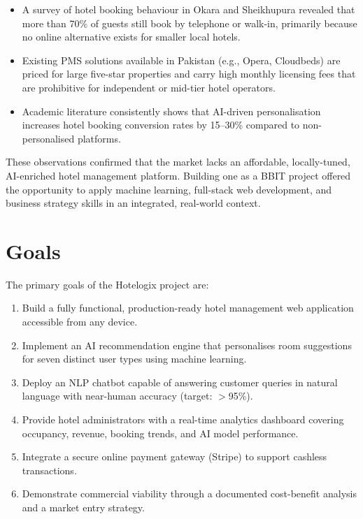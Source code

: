 \documentclass[12pt,a4paper]{report}
\begin{document}
\begin{itemize}[leftmargin=*, label=\textbullet]
  \item A survey of hotel booking behaviour in Okara and Sheikhupura revealed that more than 70\% of guests still book by telephone or walk-in, primarily because no online alternative exists for smaller local hotels.
  \item Existing PMS solutions available in Pakistan (e.g., Opera, Cloudbeds) are priced for large five-star properties and carry high monthly licensing fees that are prohibitive for independent or mid-tier hotel operators.
  \item Academic literature consistently shows that AI-driven personalisation increases hotel booking conversion rates by 15--30\% compared to non-personalised platforms.
\end{itemize}

These observations confirmed that the market lacks an affordable, locally-tuned, AI-enriched hotel management platform. Building one as a BBIT project offered the opportunity to apply machine learning, full-stack web development, and business strategy skills in an integrated, real-world context.

\section{Goals}

The primary goals of the Hotelogix project are:

\begin{enumerate}[leftmargin=*, label=\arabic*.]
  \item Build a fully functional, production-ready hotel management web application accessible from any device.
  \item Implement an AI recommendation engine that personalises room suggestions for seven distinct user types using machine learning.
  \item Deploy an NLP chatbot capable of answering customer queries in natural language with near-human accuracy (target: $>$95\%).
  \item Provide hotel administrators with a real-time analytics dashboard covering occupancy, revenue, booking trends, and AI model performance.
  \item Integrate a secure online payment gateway (Stripe) to support cashless transactions.
  \item Demonstrate commercial viability through a documented cost-benefit analysis and a market entry strategy.
\end{enumerate}
\end{document}
